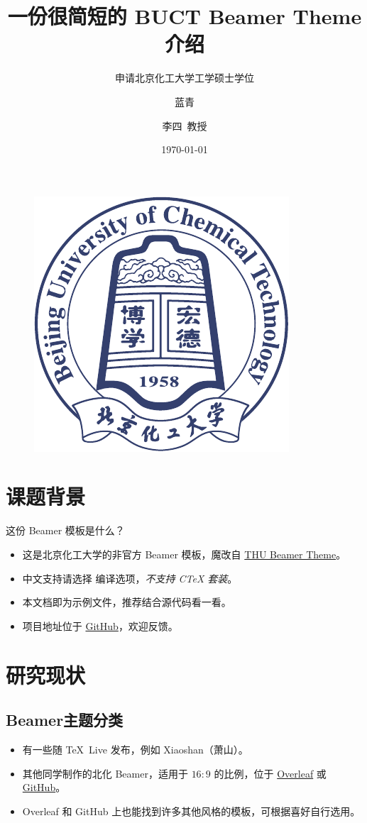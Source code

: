 \documentclass[no-math]{ctexbeamer}
\author[蓝青]{蓝青 \and 李四~教授}
\title{一份很简短的 BUCT Beamer Theme 介绍}
\subtitle{申请北京化工大学工学硕士学位}
\institute[CMSE of BUCT]{北京化工大学\quad 材料科学与工程学院}
\date{\today}
\begin{document}
\begin{frame}
	\titlepage
	\begin{figure}[htpb]
		\begin{center}
			\includegraphics[width=0.15\linewidth]{pic/BUCT-badge.pdf}
		\end{center}
	\end{figure}
\end{frame}

\begin{frame}
	\tableofcontents[sectionstyle=show,subsectionstyle=show/shaded/hide,subsubsectionstyle=show/shaded/hide]
\end{frame}


\section{课题背景}

\begin{frame}{这份 Beamer 模板是什么？}
	\begin{itemize}[<+-| alert@+>] %
		\item 这是北京化工大学的非官方 Beamer 模板，魔改自 \href{https://www.overleaf.com/latex/templates/thu-beamer-theme/vwnqmzndvwyb}{THU Beamer Theme}。
		\item 中文支持请选择 \XeLaTeX 编译选项，\emph{不支持 CTeX 套装}。
		\item 本文档即为示例文件，推荐结合源代码看一看。
		\item 项目地址位于 \href{https://github.com/Miracle0565/buct-Beamer-Theme}{GitHub}，欢迎反馈。
	\end{itemize}
\end{frame}


\section{研究现状}

\subsection{Beamer主题分类}

\begin{frame}
	\begin{itemize}
		\item 有一些随 \TeX\ Live 发布，例如 Xiaoshan（萧山）。\pause
		\item 其他同学制作的北化 Beamer，适用于 $16:9$ 的比例，位于 \href{https://cn.overleaf.com/latex/templates/beamer-for-buct/rndypbwvfxrp}{Overleaf} 或 \href{https://github.com/Livioni/Beamer-Temlate-for-BUCT}{GitHub}。\pause
		\item Overleaf 和 GitHub 上也能找到许多其他风格的模板，可根据喜好自行选用。
	\end{itemize}
\end{frame}
\end{document}
